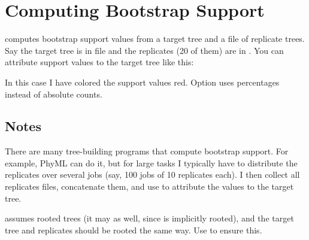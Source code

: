 \section{Computing Bootstrap Support}

\support{} computes bootstrap support values from a target tree and a file of
replicate trees. Say the target tree is in file  and the
replicates (20 of them) are in . You can attribute
support values to the target tree like this:


In this case I have colored the support values red. Option  uses
percentages instead of absolute counts.

\subsection{Notes}

There are many tree-building programs that compute bootstrap support. For
example, PhyML can do it, but for large tasks I typically have to distribute
the replicates over several jobs (say, 100 jobs of 10 replicates each). I then
collect all replicates files, concatenate them, and use \support{} to attribute
the values to the target tree.

\support{} assumes rooted trees (it may as well, since \nw{} is implicitly
rooted), and the target tree and replicates should be rooted the same way. Use
\reroot{} to ensure this.
